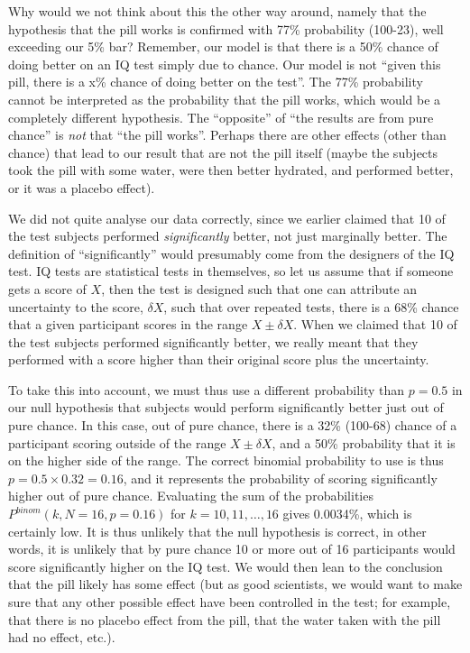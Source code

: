 Why would we not think about this the other way around, namely that the hypothesis that the pill works is confirmed with 77\% probability (100-23), well exceeding our 5\% bar? Remember, our model is that there is a 50\% chance of doing better on an IQ test simply due to chance. Our model is not ``given this pill, there is a x\% chance of doing better on the test''. The 77\% probability cannot be interpreted as the probability that the pill works, which would be a completely different hypothesis. The ``opposite'' of ``the results are from pure chance'' is \textit{not} that ``the pill works''. Perhaps there are other effects (other than chance) that lead to our result that are not the pill itself (maybe the subjects took the pill with some water, were then better hydrated, and performed better, or it was a placebo effect). 

We did not quite analyse our data correctly, since we earlier claimed that 10 of the test subjects performed \textit{significantly} better, not just marginally better. The definition of ``significantly'' would presumably come from the designers of the IQ test. IQ tests are statistical tests in themselves, so let us assume that if someone gets a score of $X$, then the test is designed such that one can attribute an uncertainty to the score, $\delta X$, such that over repeated tests, there is a 68\% chance that a given participant scores in the range $X \pm \delta X$. When we claimed that 10 of the test subjects performed significantly better, we really meant that they performed with a score higher than their original score plus the uncertainty.

To take this into account, we must thus use a different probability than $p=0.5$ in our null hypothesis that subjects would perform significantly better just out of pure chance. In this case, out of pure chance, there is a 32\% (100-68) chance of a participant scoring outside of the range $X \pm \delta X$, and a 50\% probability that it is on the higher side of the range. The correct binomial probability to use is thus $p=0.5\times 0.32=0.16$, and it represents the probability of scoring significantly higher out of pure chance. Evaluating the sum of the probabilities $P^{binom}(k,N=16,p=0.16)$ for $k=10, 11, \dots, 16$ gives 0.0034\%, which is certainly low. It is thus unlikely that the null hypothesis is correct, in other words, it is unlikely that by pure chance 10 or more out of 16 participants would score significantly higher on the IQ test. We would then lean to the conclusion that the pill likely has some effect (but as good scientists, we would want to make sure that any other possible effect have been controlled in the test; for example, that there is no placebo effect from the pill, that the water taken with the pill had no effect, etc.).


